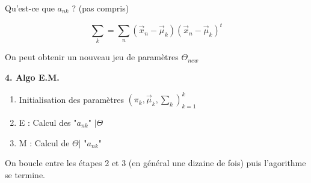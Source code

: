 \documentclass{article}
\begin{document}
Qu'est-ce que $a_{nk}$ ? (pas compris)

\[ \sum_k = \sum_n (\vec{x}_n - \vec{\mu}_k) (\vec{x}_n - \vec{\mu}_k) ^{t}  \]

On peut obtenir un nouveau jeu de paramètres $\Theta_{new}$

\textbf{4. Algo E.M.}

\begin{enumerate}
\item Initialisation des paramètres $(\pi_k, \vec{\mu}_k, \sum_k)_{k = 1}^{k}$
\item E : Calcul des "$a_{nk}$" $ | \Theta$
\item M : Calcul de $\Theta | $ "$a_{nk}$"
\end{enumerate}

On boucle entre les étapes 2 et 3 (en général une dizaine de fois) puis l'agorithme se termine.
\end{document}
